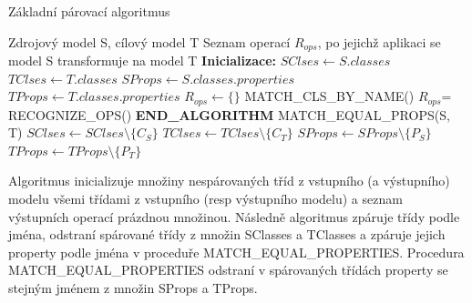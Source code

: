 \documentclass[11pt,twoside,a4paper]{book}
\begin{document}
 \begin{algorithm}
 \caption{Základní párovací algoritmus}\label{algo:matching}

\begin{algorithmic}[1]
   \Require Zdrojový model S, cílový model T
   \Ensure Seznam operací $R_{ops}$, po jejichž aplikaci se model S transformuje
       na model T
   \Statex
   \State \textbf{Inicializace:}
   \State $SClses \gets S.classes$  
   \State $TClses \gets T.classes$ 
   \State $SProps \gets S.classes.properties$ 
   \State $TProps \gets T.classes.properties$ 
   \State $R_{ops} \gets \{\}$
   \Statex	   
   \State MATCH\_CLS\_BY\_NAME()
   \State $R_{ops}$= RECOGNIZE\_OPS()
   \State \textbf{END\_ALGORITHM}
   \Statex
    \label{algo:matching:forEqualCls}
   	        \State MATCH\_EQUAL\_PROPS(S, T) 
   	        \State $SClses \gets SClses \setminus \{ C_S\}$
   	        \State $TClses \gets TClses \setminus \{ C_T\}$   	        
   	     \EndIf
      \EndFor
   \EndFor
  \EndProcedure	      
   \Statex	
   	           \State $SProps \gets SProps \setminus \{ P_S\}$
   	           \State $TProps \gets TProps \setminus \{ P_T\}$
   	        \EndIf
   	      \EndFor
   	   \EndFor
   \EndProcedure  
\end{algorithmic}
\end{algorithm}
\FloatBarrier

Algoritmus inicializuje množiny nespárovaných tříd z vstupního (a výstupního)
modelu všemi třídami z vstupního (resp výstupního modelu) a seznam výstupních
operací prázdnou množinou. Následně algoritmus zpáruje třídy podle jména,
odstraní spárované třídy z množin SClasses a TClasses a zpáruje jejich property
podle jména v proceduře MATCH\_EQUAL\_PROPERTIES. Procedura
MATCH\_EQUAL\_PROPERTIES odstraní v spárovaných třídách property se stejným
jménem z množin SProps a TProps.
\end{document}
